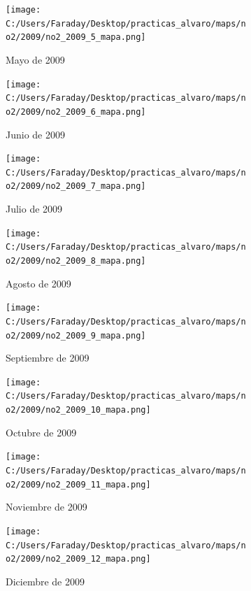 \documentclass[12pt]{article}
\begin{document}
\newpage

\begin{figure}[H]
\centering
\begin{subfigure}[h]{0.45\textwidth}
\texttt{[image: C:/Users/Faraday/Desktop/practicas\_alvaro/maps/no2/2009/no2\_2009\_5\_mapa.png]}
\caption{Mayo de 2009}
\label{fig:map-mon-1-5-2009}
\end{subfigure}
%
\begin{subfigure}[H]{0.45\textwidth}
\texttt{[image: C:/Users/Faraday/Desktop/practicas\_alvaro/maps/no2/2009/no2\_2009\_6\_mapa.png]}
\caption{Junio de 2009}
\label{fig:map-mon-1-6-2009}
\end{subfigure}
\caption{}
\end{figure}

\begin{figure}[H]
\centering
\begin{subfigure}[h]{0.45\textwidth}
\texttt{[image: C:/Users/Faraday/Desktop/practicas\_alvaro/maps/no2/2009/no2\_2009\_7\_mapa.png]}
\caption{Julio de 2009}
\label{fig:map-mon-1-7-2009}
\end{subfigure}
%
\begin{subfigure}[H]{0.45\textwidth}
\texttt{[image: C:/Users/Faraday/Desktop/practicas\_alvaro/maps/no2/2009/no2\_2009\_8\_mapa.png]}
\caption{Agosto de 2009}
\label{fig:map-mon-1-8-2009}
\end{subfigure}
\caption{}
\end{figure}

\begin{figure}[H]
\centering
\begin{subfigure}[h]{0.45\textwidth}
\texttt{[image: C:/Users/Faraday/Desktop/practicas\_alvaro/maps/no2/2009/no2\_2009\_9\_mapa.png]}
\caption{Septiembre de 2009}
\label{fig:map-mon-1-9-2009}
\end{subfigure}
%
\begin{subfigure}[H]{0.45\textwidth}
\texttt{[image: C:/Users/Faraday/Desktop/practicas\_alvaro/maps/no2/2009/no2\_2009\_10\_mapa.png]}
\caption{Octubre de 2009}
\label{fig:map-mon-1-10-2009}
\end{subfigure}
\caption{}
\end{figure}

\newpage

\begin{figure}[H]
\centering
\begin{subfigure}[h]{0.45\textwidth}
\texttt{[image: C:/Users/Faraday/Desktop/practicas\_alvaro/maps/no2/2009/no2\_2009\_11\_mapa.png]}
\caption{Noviembre de 2009}
\label{fig:map-mon-1-11-2009}
\end{subfigure}
%
\begin{subfigure}[H]{0.45\textwidth}
\texttt{[image: C:/Users/Faraday/Desktop/practicas\_alvaro/maps/no2/2009/no2\_2009\_12\_mapa.png]}
\caption{Diciembre de 2009}
\label{fig:map-mon-1-12-2009}
\end{subfigure}
\caption{}
\end{figure}
\end{document}
